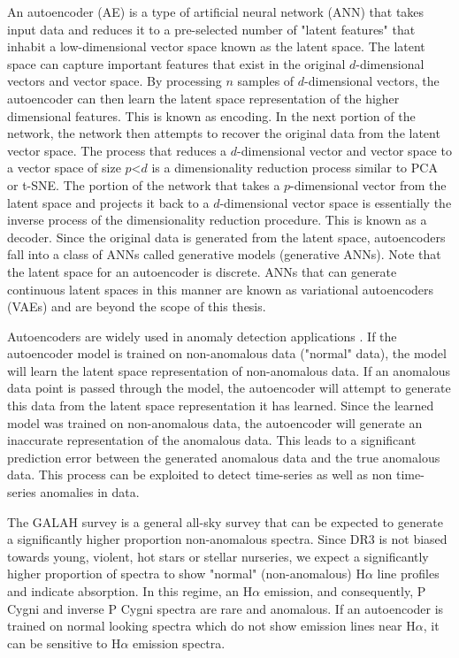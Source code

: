 An autoencoder (AE) is a type of artificial neural network (ANN) that takes input data and reduces it to a pre-selected number of "latent features" that inhabit a low-dimensional vector space known as the latent space. The latent space can capture important features that exist in the original $d$-dimensional vectors and vector space. By processing $n$ samples of $d$-dimensional vectors, the autoencoder can then learn the latent space representation of the higher dimensional features. This is known as encoding. In the next portion of the network, the network then attempts to recover the original data from the latent vector space. The process that reduces a $d$-dimensional vector and vector space to a vector space of size $p$<$d$ is a dimensionality reduction process similar to PCA or t-SNE. The portion of the network that takes a $p$-dimensional vector from the latent space and projects it back to a $d$-dimensional vector space is essentially the inverse process of the dimensionality reduction procedure. This is known as a decoder. Since the original data is generated from the latent space, autoencoders fall into a class of ANNs called generative models (generative ANNs). Note that the latent space for an autoencoder is discrete. ANNs that can generate continuous latent spaces in this manner are known as variational autoencoders (VAEs) and are beyond the scope of this thesis. 

Autoencoders are widely used in anomaly detection applications \cite{sakurada2014anomaly}. If the autoencoder model is trained on non-anomalous data ("normal" data), the model will learn the latent space representation of non-anomalous data. If an anomalous data point is passed through the model, the autoencoder will attempt to generate this data from the latent space representation it has learned. Since the learned model was trained on non-anomalous data, the autoencoder will generate an inaccurate representation of the anomalous data. This leads to a significant prediction error between the generated anomalous data and the true anomalous data. This process can be exploited to detect time-series as well as non time-series anomalies in data.

The GALAH survey is a general all-sky survey that can be expected to generate a significantly higher proportion non-anomalous spectra. Since DR3 is not biased towards young, violent, hot stars or stellar nurseries, we expect a significantly higher proportion of spectra to show "normal" (non-anomalous) H$\alpha$ line profiles and indicate absorption. In this regime, an H$\alpha$ emission, and consequently, P Cygni and inverse P Cygni spectra are rare and anomalous. If an autoencoder is trained on normal looking spectra which do not show emission lines near H$\alpha$, it can be sensitive to H$\alpha$ emission spectra. 

